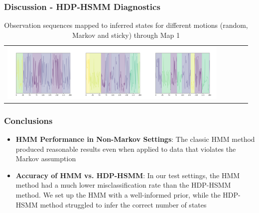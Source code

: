 \documentclass{beamer}
\begin{document}
\begin{frame}
    \frametitle{Discussion - HDP-HSMM Diagnostics}
    \newcommand{\addrandomseqa}{\includegraphics[width=10em]{images/hdphsmm/random-m1-seq.png}}
    \newcommand{\addmarkovseqa}{\includegraphics[width=10em]{images/hdphsmm/markov-m1-seq.png}}
    \newcommand{\addcorrseqa}{\includegraphics[width=10em]{images/hdphsmm/corr-m1-seq.png}}
    \begin{table}[H]
    \sffamily
    \centering
    \begin{tabular}{l*4{c}@{}}
    \addrandomseqa \addmarkovseqa \addcorrseqa \\
    \end{tabular}
    \caption{Observation sequences mapped to inferred states for different motions (random, Markov and sticky) through Map 1}
    \label{table:stateinfer}
    \end{table}
\end{frame}



\begin{frame}
	\frametitle{Conclusions}
	\begin{itemize}
		\item \textbf{HMM Performance in Non-Markov Settings}: The classic HMM method produced reasonable results even when applied to data that violates the Markov assumption
		\item \textbf{Accuracy of HMM vs. HDP-HSMM}: In our test settings, the HMM method had a much lower misclassification rate than the HDP-HSMM method. We set up the HMM with a well-informed prior, while the HDP-HSMM method struggled to infer the correct number of states
	\end{itemize}
\end{frame}
\end{document}
